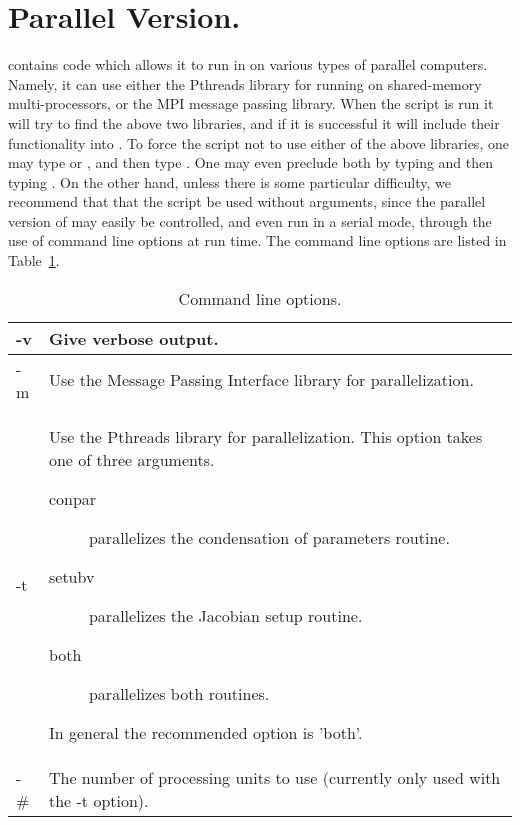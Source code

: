 \section{Parallel Version.} \label{sec:Parallel}
\AUTOc contains code which allows
it to run in on various types of parallel computers.  Namely,
it can use either the Pthreads library for running on
shared-memory multi-processors, or the MPI message passing library.
When the  script is run it will try to
find the above two libraries, and if it is successful
it will include their functionality into \AUTOc.
To force the  script not to use either
of the above libraries, one may type 
or , and then type .
One may even preclude both by typing 
 and then
typing .  On the other hand, unless there is some
particular difficulty, we recommend that that the 
 script be used without arguments, since the
parallel version of \AUTOc may easily be controlled,
and even run in a serial mode,  
through the use of command line options at run time.
The command line options are listed in Table~\ref{tbl:Command_line_args}.

\begin{table}[htbp]
\begin{center}
\begin{tabular}{| l | l |}
\hline
-v&    Give verbose output.\\
\hline
-m&    Use the Message Passing Interface library for parallelization.\\
\hline
-t&    \begin{minipage}{4in}
       Use the Pthreads library for parallelization.
       This option takes one of three arguments.
       \begin{description}
       \item[conpar] parallelizes the condensation of parameters routine.
       \item[setubv] parallelizes the Jacobian setup routine.
       \item[both]   parallelizes both routines.
       \end{description}
       In general the recommended option is 'both'.
       \end{minipage}\\
\hline
-\#&    \parbox{4in}{The number of processing units to use 
                     (currently only used with the -t option).}\\
\hline
\end{tabular}
\caption{Command line options.}
\label{tbl:Command_line_args}
\end{center}
\end{table}
 
